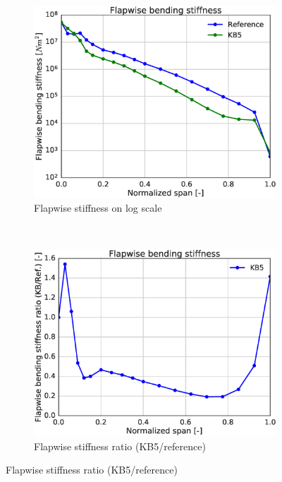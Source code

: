%
\begin{figure}[tph]
\begin{subfigure}{0.50\textwidth}
\includegraphics[width=\linewidth]{figures/KB6_final/KB5_flapStiff_log.eps}
\caption{Flapwise stiffness on log scale}
\label{subfig:KB5_flapstiff_log}
\end{subfigure}
 ~
\begin{subfigure}{0.50\textwidth}
\includegraphics[width=\linewidth]{figures/KB6_final/KB5_flapStiff_ratio.eps}
\caption{Flapwise stiffness ratio (KB5/reference)}
\label{subfig:KB5_flapstiff_ratio}
\end{subfigure}


\end{figure}
